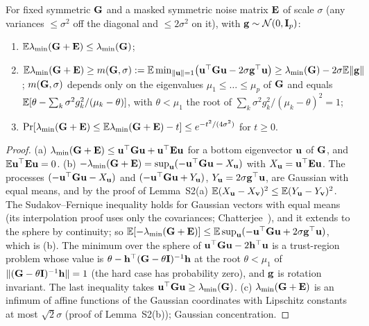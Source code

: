 \begin{lemma}\label{lem:S8bias}
For fixed symmetric $\mathbf{G}$ and a masked symmetric noise matrix $\mathbf{E}$ of scale $\sigma$ (any variances $\le\sigma^2$ off the diagonal and $\le2\sigma^2$ on it), with $\mathbf{g}\sim\mathcal N(0,\mathbf{I}_p)$:
\begin{enumerate}[nosep,label=(\alph*)]
  \item $\mathbb{E}\lambda_{\min}(\mathbf{G}+\mathbf{E})\le\lambda_{\min}(\mathbf{G})$;
  \item $\mathbb{E}\lambda_{\min}(\mathbf{G}+\mathbf{E})\ge m(\mathbf{G},\sigma):=\mathbb{E}\min_{\|\mathbf{u}\|=1}\bigl(\mathbf{u}^\top\mathbf{G}\mathbf{u}-2\sigma\mathbf{g}^\top\mathbf{u}\bigr)\ge\lambda_{\min}(\mathbf{G})-2\sigma\mathbb{E}\|\mathbf{g}\|$; $m(\mathbf{G},\sigma)$ depends only on the eigenvalues $\mu_1\le\dots\le\mu_p$ of $\mathbf{G}$ and equals $\mathbb{E}[\theta-\sum_k\sigma^2g_k^2/(\mu_k-\theta)]$, with $\theta<\mu_1$ the root of $\sum_k\sigma^2g_k^2/(\mu_k-\theta)^2=1$;
  \item $\Pr[\lambda_{\min}(\mathbf{G}+\mathbf{E})\le\mathbb{E}\lambda_{\min}(\mathbf{G}+\mathbf{E})-t]\le e^{-t^2/(4\sigma^2)}$ for $t\ge0$.
\end{enumerate}
\end{lemma}
\begin{proof}
(a) $\lambda_{\min}(\mathbf{G}+\mathbf{E})\le\mathbf{u}^\top\mathbf{G}\mathbf{u}+\mathbf{u}^\top\mathbf{E}\mathbf{u}$ for a bottom eigenvector $\mathbf{u}$ of $\mathbf{G}$, and $\mathbb{E}\mathbf{u}^\top\mathbf{E}\mathbf{u}=0$. (b) $-\lambda_{\min}(\mathbf{G}+\mathbf{E})=\sup_{\mathbf{u}}(-\mathbf{u}^\top\mathbf{G}\mathbf{u}-X_{\mathbf{u}})$ with $X_{\mathbf{u}}=\mathbf{u}^\top\mathbf{E}\mathbf{u}$. The processes $(-\mathbf{u}^\top\mathbf{G}\mathbf{u}-X_{\mathbf{u}})$ and $(-\mathbf{u}^\top\mathbf{G}\mathbf{u}+Y_{\mathbf{u}})$, $Y_{\mathbf{u}}=2\sigma\mathbf{g}^\top\mathbf{u}$, are Gaussian with equal means, and by the proof of Lemma~S2(a) $\mathbb{E}(X_{\mathbf{u}}-X_{\mathbf{v}})^2\le\mathbb{E}(Y_{\mathbf{u}}-Y_{\mathbf{v}})^2$. The Sudakov--Fernique inequality holds for Gaussian vectors with equal means (its interpolation proof uses only the covariances; Chatterjee~\cite{Chatterjee05}), and it extends to the sphere by continuity; so $\mathbb{E}[-\lambda_{\min}(\mathbf{G}+\mathbf{E})]\le\mathbb{E}\sup_{\mathbf{u}}(-\mathbf{u}^\top\mathbf{G}\mathbf{u}+2\sigma\mathbf{g}^\top\mathbf{u})$, which is (b). The minimum over the sphere of $\mathbf{u}^\top\mathbf{G}\mathbf{u}-2\mathbf h^\top\mathbf{u}$ is a trust-region problem whose value is $\theta-\mathbf h^\top(\mathbf{G}-\theta\mathbf{I})^{-1}\mathbf h$ at the root $\theta<\mu_1$ of $\|(\mathbf{G}-\theta\mathbf{I})^{-1}\mathbf h\|=1$ (the hard case has probability zero), and $\mathbf{g}$ is rotation invariant. The last inequality takes $\mathbf{u}^\top\mathbf{G}\mathbf{u}\ge\lambda_{\min}(\mathbf{G})$. (c) $\lambda_{\min}(\mathbf{G}+\mathbf{E})$ is an infimum of affine functions of the Gaussian coordinates with Lipschitz constants at most $\sqrt2\sigma$ (proof of Lemma~S2(b)); Gaussian concentration.
\end{proof}

